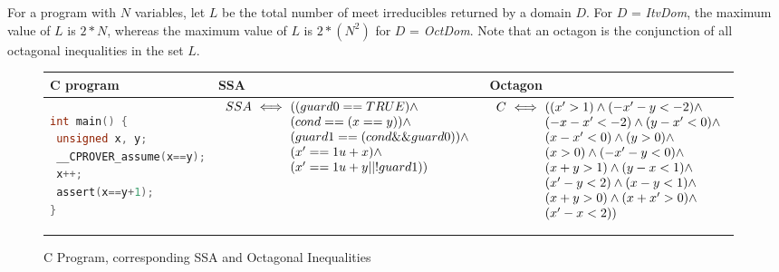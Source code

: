 For a program with $N$ variables, let $L$ be the total number of 
meet irreducibles returned by a domain $D$.  For $D$ = {\em ItvDom}, the 
maximum value of $L$ is $2*N$, whereas the maximum value of $L$ is 
$2*(N^2)$ for $D$ = {\em OctDom}. Note that an octagon is the conjunction 
of all octagonal inequalities in the set $L$.
%
\begin{figure}[t]
\scriptsize
\begin{tabular}{l|l|l}
\hline
C program & SSA & Octagon \\
\hline
\begin{lstlisting}[mathescape=true,language=C]
int main() {
 unsigned x, y;
 __CPROVER_assume(x==y);
 x++;
 assert(x==y+1);
}
\end{lstlisting}
&
\begin{minipage}{4.40cm}
$\begin{array}{l@{\,\,}c@{\,\,}l}
SSA &\iff& ((guard0 == TRUE) \land \\
    &    & (cond == (x == y)) \land \\
    &    & (guard1 == (cond \&\& guard0)) \land \\
    &    & (x' == 1u + x) \land \\
    &    & (x' == 1u + y || !guard1))
\end{array}$
\end{minipage}
&
\begin{minipage}{3.75cm}
$\begin{array}{l@{\,\,}c@{\,\,}l}
C &\iff& ((x' > 1) \land (-x'-y < -2) \land \\
  &    & (-x-x' < -2) \land (y-x' < 0) \land \\                                                                
  &    & (x-x' < 0) \land (y > 0) \land \\
  &    & (x > 0) \land (-x'-y < 0) \land \\
  &    & (x+y > 1) \land (y-x < 1) \land \\
  &    & (x'-y < 2) \land (x-y < 1) \land \\
  &    & (x+y > 0) \land (x+x' > 0) \land \\
  &    & (x'-x < 2))
\end{array}$
\end{minipage}
\\
\hline
\end{tabular}
\caption{C Program, corresponding SSA and Octagonal Inequalities}
\label{swssa}
\end{figure}
%
